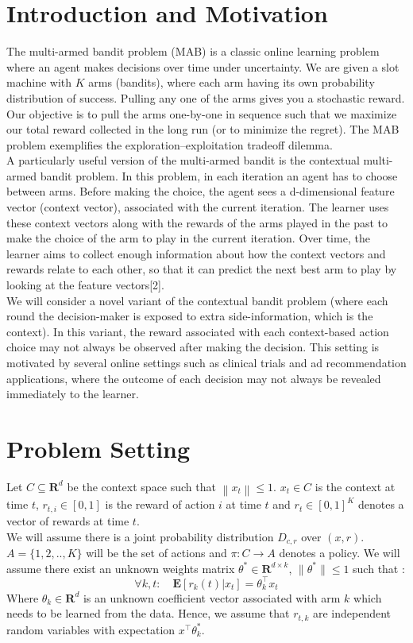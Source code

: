 \documentclass{article}
\newcommand{\norm}[1]{\left\lVert#1\right\rVert}
\begin{document}
\section{Introduction and Motivation}

The multi-armed bandit problem (MAB) is a classic online learning problem where an agent makes decisions over time under uncertainty. We are given a slot machine with $K$ arms (bandits), where each arm having its own probability distribution of success. Pulling any one of the arms gives you a stochastic reward. Our objective is to pull the arms one-by-one in sequence such that we maximize our total reward collected in the long run (or to minimize the regret). The MAB problem exemplifies the exploration–exploitation tradeoff dilemma. \\

A particularly useful version of the multi-armed bandit is the contextual multi-armed bandit problem. In this problem, in each iteration an agent has to choose between arms. Before making the choice, the agent sees a d-dimensional feature vector (context vector), associated with the current iteration. The learner uses these context vectors along with the rewards of the arms played in the past to make the choice of the arm to play in the current iteration. Over time, the learner aims to collect enough information about how the context vectors and rewards relate to each other, so that it can predict the next best arm to play by looking at the feature vectors[2].\\

We will consider a novel variant of the contextual bandit problem (where each round the decision-maker is exposed to extra side-information, which is the context). In this variant, the reward associated with each context-based action choice may not always be observed after making the decision. This setting is motivated by several online settings such as clinical trials and ad recommendation applications, where the outcome of each decision may not always be revealed immediately to the learner.\\

\section{Problem Setting}

Let $C \subseteq \mathbf{R}^d$ be the context space such that $\norm{x_t} \leq 1$. $x_t \in C$ is the context at time $t$, $r_{t,i}\in [0,1]$ is the reward of action $i$ at time $t$ and $r_t \in [0,1]^K$ denotes a vector of rewards at time $t$.\\
We will assume there is a joint probability distribution $D_{c,r}$ over $(x,r)$. $A= \{1,2,..,K\}$ will be the set of actions and $\pi:C\rightarrow A$ denotes a policy. We will assume there exist an unknown weights matrix $\theta^* \in \mathbf{R}^{d\times k}$, $\|\theta^*\|\leq 1$ such that :
\[\forall k,t:\quad \mathbf{E}[r_k(t)|x_t]= \theta^\top_kx_t\]
Where $\theta_k \in \mathbf{R}^d$ is an unknown coefficient vector associated with arm $k$ which needs to be learned from the data. Hence, we assume that $r_{t,k}$ are independent random variables with expectation $x^\top\theta^*_k $.\\
\end{document}

